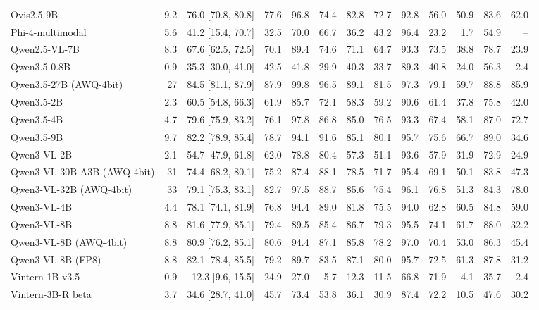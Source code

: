 \begin{table}[t]
\begin{tabular}{lrrrrrrrrrrrr}
Ovis2.5-9B & 9.2 & 76.0 [70.8, 80.8] & 77.6 & 96.8 & 74.4 & 82.8 & 72.7 & 92.8 & 56.0 & 50.9 & 83.6 & 62.0 \\
Phi-4-multimodal & 5.6 & 41.2 [15.4, 70.7] & 32.5 & 70.0 & 66.7 & 36.2 & 43.2 & 96.4 & 23.2 & 1.7 & 54.9 & – \\
Qwen2.5-VL-7B & 8.3 & 67.6 [62.5, 72.5] & 70.1 & 89.4 & 74.6 & 71.1 & 64.7 & 93.3 & 73.5 & 38.8 & 78.7 & 23.9 \\
Qwen3.5-0.8B & 0.9 & 35.3 [30.0, 41.0] & 42.5 & 41.8 & 29.9 & 40.3 & 33.7 & 89.3 & 40.8 & 24.0 & 56.3 & 2.4 \\
Qwen3.5-27B (AWQ-4bit) & 27 & 84.5 [81.1, 87.9] & 87.9 & 99.8 & 96.5 & 89.1 & 81.5 & 97.3 & 79.1 & 59.7 & 88.8 & 85.9 \\
Qwen3.5-2B & 2.3 & 60.5 [54.8, 66.3] & 61.9 & 85.7 & 72.1 & 58.3 & 59.2 & 90.6 & 61.4 & 37.8 & 75.8 & 42.0 \\
Qwen3.5-4B & 4.7 & 79.6 [75.9, 83.2] & 76.1 & 97.8 & 86.8 & 85.0 & 76.5 & 93.3 & 67.4 & 58.1 & 87.0 & 72.7 \\
Qwen3.5-9B & 9.7 & 82.2 [78.9, 85.4] & 78.7 & 94.1 & 91.6 & 85.1 & 80.1 & 95.7 & 75.6 & 66.7 & 89.0 & 34.6 \\
Qwen3-VL-2B & 2.1 & 54.7 [47.9, 61.8] & 62.0 & 78.8 & 80.4 & 57.3 & 51.1 & 93.6 & 57.9 & 31.9 & 72.9 & 24.9 \\
Qwen3-VL-30B-A3B (AWQ-4bit) & 31 & 74.4 [68.2, 80.1] & 75.2 & 87.4 & 88.1 & 78.5 & 71.7 & 95.4 & 69.1 & 50.1 & 83.8 & 47.3 \\
Qwen3-VL-32B (AWQ-4bit) & 33 & 79.1 [75.3, 83.1] & 82.7 & 97.5 & 88.7 & 85.6 & 75.4 & 96.1 & 76.8 & 51.3 & 84.3 & 78.0 \\
Qwen3-VL-4B & 4.4 & 78.1 [74.1, 81.9] & 76.8 & 94.4 & 89.0 & 81.8 & 75.5 & 94.0 & 62.8 & 60.5 & 84.8 & 59.0 \\
Qwen3-VL-8B & 8.8 & 81.6 [77.9, 85.1] & 79.4 & 89.5 & 85.4 & 86.7 & 79.3 & 95.5 & 74.1 & 61.7 & 88.0 & 32.2 \\
Qwen3-VL-8B (AWQ-4bit) & 8.8 & 80.9 [76.2, 85.1] & 80.6 & 94.4 & 87.1 & 85.8 & 78.2 & 97.0 & 70.4 & 53.0 & 86.3 & 45.4 \\
Qwen3-VL-8B (FP8) & 8.8 & 82.1 [78.4, 85.5] & 79.2 & 89.7 & 83.5 & 87.1 & 80.0 & 95.7 & 72.5 & 61.3 & 87.8 & 31.2 \\
Vintern-1B v3.5 & 0.9 & 12.3 [9.6, 15.5] & 24.9 & 27.0 & 5.7 & 12.3 & 11.5 & 66.8 & 71.9 & 4.1 & 35.7 & 2.4 \\
Vintern-3B-R beta & 3.7 & 34.6 [28.7, 41.0] & 45.7 & 73.4 & 53.8 & 36.1 & 30.9 & 87.4 & 72.2 & 10.5 & 47.6 & 30.2 \\
\bottomrule
\end{tabular}
\par{}
\end{table}
